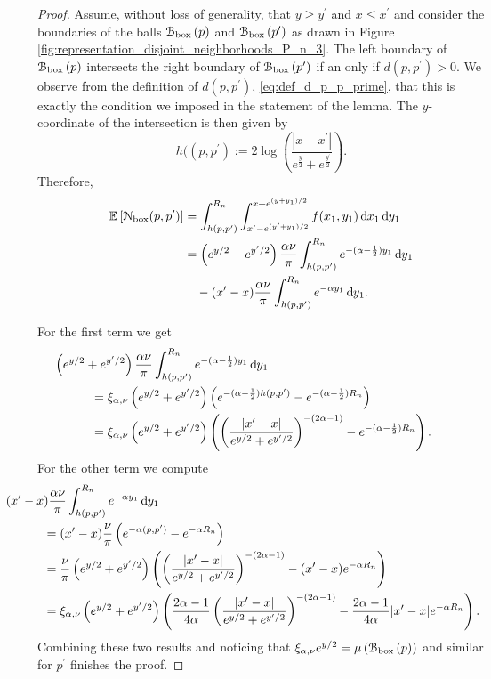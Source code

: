 \begin{proof}
Assume, without loss of generality, that $y \ge y^\prime$ and $x \le x^\prime$ and consider the boundaries of the balls ${\mathcal B}_{\text{box}}\left(p\right)$ and ${\mathcal B}_{\text{box}}\left(p^\prime\right)$ as drawn in Figure \ref{fig:representation_disjoint_neighborhoods_P_n_3}. The left boundary of ${\mathcal B}_{\text{box}}\left(p\right)$ intersects the right boundary of ${\mathcal B}_{\text{box}}\left(p^\prime\right)$ if an only if $d(p,p^\prime) > 0$. We observe from the definition of $d(p,p^\prime)$, \eqref{eq:def_d_p_p_prime}, that this is exactly the condition we imposed in the statement of the lemma. The $y$-coordinate of the intersection is then given by
\[
	h((p,p^\prime) := 2\log\left(\frac{|x - x^\prime|}{e^{\frac{y}{2}} + e^{\frac{y^\prime}{2}}}\right).
\]
Therefore,
\begin{align*}
	\mathbb{E}\left[{\mathcal N}_{\text{box}}(p,p^\prime)\right] 
	&= \int_{h(p,p^\prime)}^{R_n} \int_{x^\prime - e^{(y^\prime+y_1)/2}}^{x + e^{(y + y_1)/2}}
		f(x_1,y_1) \operatorname{\mathrm{d}\hspace{-2pt}} x_1 \operatorname{\mathrm{d}\hspace{-2pt}} y_1\\
	&= \left(e^{y/2} + e^{y^\prime/2}\right)\frac{\alpha \nu}{\pi}\int_{h(p,p^\prime)}^{R_n} 
		e^{-(\alpha - \frac{1}{2})y_1} \operatorname{\mathrm{d}\hspace{-2pt}} y_1\\
	&\hspace{10pt}- (x^\prime - x) \frac{\alpha \nu}{\pi} \int_{h(p,p^\prime)}^{R_n} e^{-\alpha y_1} \operatorname{\mathrm{d}\hspace{-2pt}} y_1.
\end{align*}

For the first term we get
\begin{align*}
	&\hspace{-30pt}\left(e^{y/2} + e^{y^\prime/2}\right)\frac{\alpha \nu}{\pi}\int_{h(p,p^\prime)}^{R_n} 
		e^{-(\alpha - \frac{1}{2})y_1} \dd y_1\\
	&= \xi_{\alpha, \nu}\left(e^{y/2} + e^{y^\prime/2}\right)\left(
		e^{-(\alpha - \frac{1}{2})h(p,p^\prime)} - e^{-(\alpha - \frac{1}{2})R_n}\right)\\
	&= \xi_{\alpha, \nu}\left(e^{y/2} + e^{y^\prime/2}\right)\left(\left(\frac{|x^\prime - x|}{e^{y/2} + 	
		e^{y^\prime/2}}\right)^{-(2\alpha - 1)} - e^{-(\alpha - \frac{1}{2})R_n}\right).
\end{align*}
For the other term we compute
\begin{align*}
	&\hspace{-30pt}(x^\prime - x) \frac{\alpha \nu}{\pi} \int_{h(p,p^\prime)}^{R_n} e^{-\alpha y_1} \dd y_1\\
	&= (x^\prime - x) \frac{\nu}{\pi}\left(e^{-\alpha(p,p^\prime)} - e^{-\alpha R_n}\right)\\
	&= \frac{\nu}{\pi}\left(e^{y/2} + e^{y^\prime/2}\right) \left(
		\left(\frac{|x^\prime - x|}{e^{y/2} + e^{y^\prime/2}}\right)^{-(2\alpha - 1)}
		- (x^\prime - x)e^{-\alpha R_n}\right)\\
	&= \xi_{\alpha, \nu}\left(e^{y/2} + e^{y^\prime/2}\right)\left(
		\frac{2\alpha - 1}{4\alpha}\left(\frac{|x^\prime - x|}{e^{y/2} + e^{y^\prime/2}}\right)^{-(2\alpha - 1)}
		- \frac{2\alpha - 1}{4\alpha}|x^\prime - x|e^{-\alpha R_n}\right).
\end{align*}
Combining these two results and noticing that $\xi_{\alpha, \nu} e^{y/2} = \mu\left({\mathcal B}_{\text{box}}\left(p\right)\right)$ and similar for $p^\prime$ finishes the proof.
\end{proof} 

